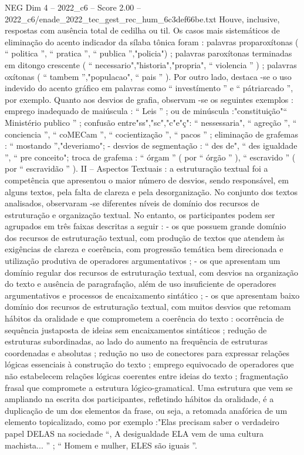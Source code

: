 \begin{textsample}{NEG Dim 4 – 2022\_c6 – Score 2.00 – 2022\_c6/enade\_2022\_tec\_gest\_rec\_hum\_6c3def66be.txt}
Houve, inclusive, respostas com ausência total de cedilha ou til.
Os casos mais sistemáticos de eliminação do acento indicador da sílaba tônica foram : palavras proparoxítonas ( “ politica ”, “ pratica ”, “ publica ”,"policia") ; palavras paroxítonas terminadas em ditongo crescente ( “ necessario","historia","propria", “ violencia ” ) ; palavras oxítonas ( “ tambem ”,"populacao", “ pais ” ).
Por outro lado, destaca -se o uso indevido do acento gráfico em palavras como “ investímento ” e “ pátriarcado ”, por exemplo.
Quanto aos desvios de grafia, observam -se os seguintes exemplos : emprego inadequado de maiúscula : “ Leis ” ; ou de minúscula :"constituição"“ Ministério publico ” ; confusão entre"ss","sc","c"e"ç": “ nessessaria", “ agreção ”, “ conciencia ”, “ coMECam ”, “ cocientização ”, “ pacos ” ; eliminação de grafemas : “ mostando ”,"deveriamo"; - desvios de segmentação : “ des de", “ des igualdade ”, “ pre conceito"; troca de grafema : “ órgam ” ( por “ órgão ” ), “ escravido ” ( por “ escravidão ” ).
II – Aspectos Textuais : a estruturação textual foi a competência que apresentou o maior número de desvios, sendo responsável, em alguns textos, pela falta de clareza e pela desorganização.
No conjunto dos textos analisados, observaram -se diferentes níveis de domínio dos recursos de estruturação e organização textual.
No entanto, os participantes podem ser agrupados em três faixas descritas a seguir : - os que possuem grande domínio dos recursos de estruturação textual, com produção de textos que atendem às exigências de clareza e coerência, com progressão temática bem direcionada e utilização produtiva de operadores argumentativos ; - os que apresentam um domínio regular dos recursos de estruturação textual, com desvios na organização do texto e ausência de paragrafação, além de uso insuficiente de operadores argumentativos e processos de encaixamento sintático ; - os que apresentam baixo domínio dos recursos de estruturação textual, com muitos desvios que retomam hábitos da oralidade e que comprometem a coerência do texto : ocorrência de sequência justaposta de ideias sem encaixamentos sintáticos ; redução de estruturas subordinadas, ao lado do aumento na frequência de estruturas coordenadas e absolutas ; redução no uso de conectores para expressar relações lógicas essenciais à construção do texto ; emprego equivocado de operadores que não estabelecem relações lógicas coerentes entre ideias do texto ; fragmentação frasal que compromete a estrutura lógico-gramatical.
Uma estrutura que vem se ampliando na escrita dos participantes, refletindo hábitos da oralidade, é a duplicação de um dos elementos da frase, ou seja, a retomada anafórica de um elemento topicalizado, como por exemplo :"Elas precisam saber o verdadeiro papel DELAS na sociedade “, A desigualdade ELA vem de uma cultura machista... ” ; “ Homem e mulher, ELES são iguais ”.

\end{textsample}
